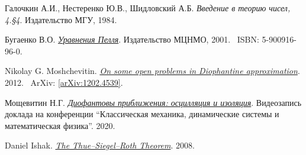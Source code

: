 \thispagestyle{supplementary}

\begingroup
    \renewcommand{\section}[2]{\subsection#1{#2}}%

    \begin{thebibliography}{5}
            Галочкин А.И., Нестеренко Ю.В., Шидловский А.Б. 
            \textit{Введение в теорию чисел, 4.\S4}. 
            Издательство МГУ, 1984.

            Бугаенко В.О. 
            \href{https://www.mccme.ru/mmmf-lectures/books/books/book.13.pdf}{\textit{Уравнения Пелля}}. 
            Издательство МЦНМО, 2001.~\newline
            ISBN: 5-900916-96-0.

            Nikolay G. Moshchevitin. 
            \href{https://arxiv.org/pdf/1202.4539.pdf}{\textit{On some open problems in Diophantine approximation}}. 
            2012.~\newline
            ArXiv: \href{https://arxiv.org/abs/1202.4539}{[arXiv:1202.4539]}.

            Мощевитин Н.Г. 
            \href{http://www.mathnet.ru/present26192}{\textit{Диофантовы приближения: осцилляция и изоляция}}. 
            Видеозапись доклада на конференции ``Классическая механика, динамические системы и математическая физика''. 
            2020.

            Daniel Ishak. 
            \href{https://uu.diva-portal.org/smash/get/diva2:302893/FULLTEXT01.pdf}{\textit{The Thue--Siegel--Roth Theorem}}. 
            2008.
    \end{thebibliography}
\endgroup
